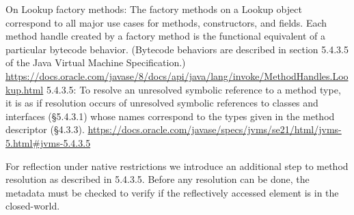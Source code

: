 On Lookup factory methods:
The factory methods on a Lookup object correspond to all major use cases for methods, constructors, and fields. Each method handle created by a factory method is the functional equivalent of a particular bytecode behavior. (Bytecode behaviors are described in section 5.4.3.5 of the Java Virtual Machine Specification.)
\url{https://docs.oracle.com/javase/8/docs/api/java/lang/invoke/MethodHandles.Lookup.html}
5.4.3.5:
To resolve an unresolved symbolic reference to a method type, it is as if resolution occurs of unresolved symbolic references to classes and interfaces (§5.4.3.1) whose names correspond to the types given in the method descriptor (§4.3.3).
\url{https://docs.oracle.com/javase/specs/jvms/se21/html/jvms-5.html#jvms-5.4.3.5}

For reflection under native restrictions we introduce an additional step to method resolution as described in 5.4.3.5. Before any resolution can be done, the metadata must be checked to verify if the reflectively accessed element is in the closed-world.

